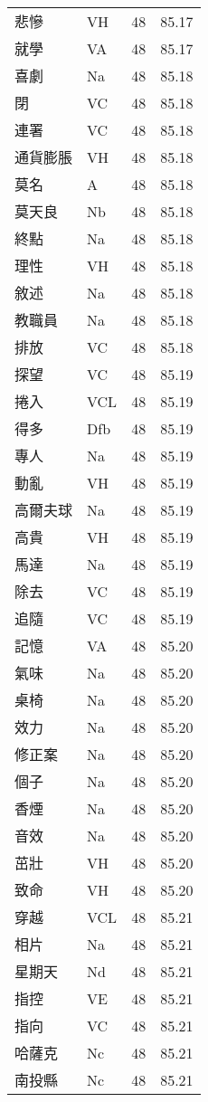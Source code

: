 \documentclass[twocolumn]{book}
\begin{document}
\begin{supertabular}{llrr}
悲慘 & VH & 48 &  85.17\\
就學 & VA & 48 &  85.17\\
喜劇 & Na & 48 &  85.18\\
閉 & VC & 48 &  85.18\\
連署 & VC & 48 &  85.18\\
通貨膨脹 & VH & 48 &  85.18\\
莫名 & A & 48 &  85.18\\
莫天良 & Nb & 48 &  85.18\\
終點 & Na & 48 &  85.18\\
理性 & VH & 48 &  85.18\\
敘述 & Na & 48 &  85.18\\
教職員 & Na & 48 &  85.18\\
排放 & VC & 48 &  85.18\\
探望 & VC & 48 &  85.19\\
捲入 & VCL & 48 &  85.19\\
得多 & Dfb & 48 &  85.19\\
專人 & Na & 48 &  85.19\\
動亂 & VH & 48 &  85.19\\
高爾夫球 & Na & 48 &  85.19\\
高貴 & VH & 48 &  85.19\\
馬達 & Na & 48 &  85.19\\
除去 & VC & 48 &  85.19\\
追隨 & VC & 48 &  85.19\\
記憶 & VA & 48 &  85.20\\
氣味 & Na & 48 &  85.20\\
桌椅 & Na & 48 &  85.20\\
效力 & Na & 48 &  85.20\\
修正案 & Na & 48 &  85.20\\
個子 & Na & 48 &  85.20\\
香煙 & Na & 48 &  85.20\\
音效 & Na & 48 &  85.20\\
茁壯 & VH & 48 &  85.20\\
致命 & VH & 48 &  85.20\\
穿越 & VCL & 48 &  85.21\\
相片 & Na & 48 &  85.21\\
星期天 & Nd & 48 &  85.21\\
指控 & VE & 48 &  85.21\\
指向 & VC & 48 &  85.21\\
哈薩克 & Nc & 48 &  85.21\\
南投縣 & Nc & 48 &  85.21\\

\end{supertabular}
\end{document}
